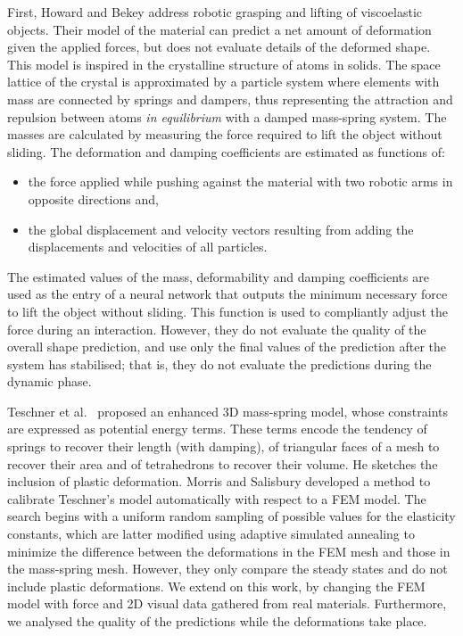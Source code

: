 \documentclass[journal]{IEEEtran}
\begin{document}
First, Howard and Bekey \cite{Howard2000} address robotic grasping and lifting of viscoelastic objects.  Their model of the material can predict a net amount of deformation given the applied forces, but does not evaluate details of the deformed shape.   This model is inspired in the crystalline structure of atoms in solids.  The space lattice of the crystal is approximated by a particle system where elements with mass are connected by springs and dampers, thus representing the attraction and repulsion between atoms \emph{in equilibrium} with a damped mass-spring system.  The masses are calculated by measuring the force required to lift the object without sliding.  The deformation and damping coefficients are estimated as functions of:
\begin{itemize}
 \item the force applied while pushing against the material with two robotic arms in opposite directions and,
 \item the global displacement and velocity vectors resulting from adding the displacements and velocities of all particles.
\end{itemize}
The estimated values of the mass, deformability and damping coefficients are used as the entry of a neural network that outputs the minimum necessary force to lift the object without sliding.  This function is used to compliantly adjust the force during an interaction.  However, they do not evaluate the quality of the overall shape prediction, and use only the final values of the prediction after the system has stabilised; that is, they do not evaluate the predictions during the dynamic phase.



Teschner et al.\ \cite{Teschner2004} proposed an enhanced 3D mass-spring model, whose constraints are expressed as potential energy terms.  These terms encode the tendency of springs to recover their length (with damping), of triangular faces of a mesh to recover their area and of tetrahedrons to recover their volume.  He sketches the inclusion of plastic deformation.  Morris and Salisbury \cite{Morris2008} developed a method to calibrate Teschner's model automatically with respect to a FEM model.  The  search begins with a uniform random sampling of possible values for the elasticity constants, which are latter modified using adaptive simulated annealing to minimize the difference between the deformations in the FEM mesh and those in the mass-spring mesh.  However, they only compare the steady states and do not include plastic deformations.  We extend on this work, by changing the FEM model with force and 2D visual data gathered from real materials.  Furthermore, we analysed the quality of the predictions while the deformations take place.
\end{document}
